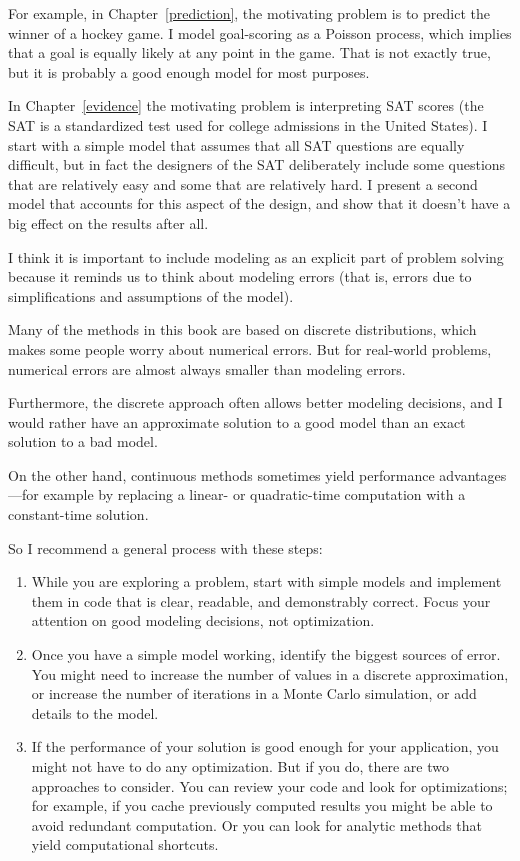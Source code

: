 \documentclass[12pt]{book}
\theoremstyle{exercise}
\begin{document}
For example, in Chapter~\ref{prediction}, the motivating problem is to
predict the winner of a hockey game.  I model goal-scoring as a
Poisson process, which implies that a goal is equally likely at any
point in the game.  That is not exactly true, but it is probably a
good enough model for most purposes.

In Chapter~\ref{evidence} the motivating problem is interpreting SAT
scores (the SAT is a standardized test used for college admissions in
the United States).  I start with a simple model that assumes that all
SAT questions are equally difficult, but in fact the designers of the
SAT deliberately include some questions that are relatively easy and
some that are relatively hard.  I present a second model that accounts
for this aspect of the design, and show that it doesn't have a big
effect on the results after all.

I think it is important to include modeling as an explicit part
of problem solving because it reminds us to think about modeling
errors (that is, errors due to simplifications and assumptions
of the model).

Many of the methods in this book are based on discrete distributions,
which makes some people worry about numerical errors.  But for
real-world problems, numerical errors are almost always
smaller than modeling errors.

Furthermore, the discrete approach often allows better modeling
decisions, and I would rather have an approximate solution
to a good model than an exact solution to a bad model.

On the other hand, continuous methods sometimes yield performance
advantages---for example by replacing a linear- or quadratic-time
computation with a constant-time solution.

So I recommend a general process with these steps:

\begin{enumerate}

\item While you are exploring a problem, start with simple models and
  implement them in code that is clear, readable, and demonstrably
  correct.  Focus your attention on good modeling decisions, not
  optimization.

\item Once you have a simple model working, identify the
  biggest sources of error.  You might need to increase the number of
  values in a discrete approximation, or increase the number of
  iterations in a Monte Carlo simulation, or add details to the model.

\item If the performance of your solution is good enough for your
  application, you might not have to do any optimization.  But if you
  do, there are two approaches to consider.  You can review your code
  and look for optimizations; for example, if you cache previously
  computed results you might be able to avoid redundant computation.
  Or you can look for analytic methods that yield computational
  shortcuts.

\end{enumerate}
\end{document}
